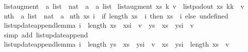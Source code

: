 \begin{isabellebody}
\isanewline
{}\isamarkupfalse%
\ list{\isacharunderscore}augment\ {\isacharcolon}{\isacharcolon}\ {\isachardoublequoteopen}{\isacharprime}a\ list\ {\isasymRightarrow}\ nat\ {\isasymRightarrow}\ {\isacharprime}a\ {\isasymRightarrow}\ {\isacharprime}a\ list{\isachardoublequoteclose}\ \isanewline
{\isachardoublequoteopen}list{\isacharunderscore}augment\ xs\ k\ v\ {\isacharequal}\ {\isacharparenleft}list{\isacharunderscore}pad{\isacharunderscore}out\ xs\ k{\isacharparenright}{\isacharbrackleft}k\ {\isacharcolon}{\isacharequal}\ v{\isacharbrackright}{\isachardoublequoteclose}\isanewline
\isanewline
{}\isamarkupfalse%
\ nth{\isacharprime}\ {\isacharcolon}{\isacharcolon}\ {\isachardoublequoteopen}{\isacharprime}a\ list\ {\isasymRightarrow}\ nat\ {\isasymRightarrow}\ {\isacharprime}a{\isachardoublequoteclose}\ \isanewline
{\isachardoublequoteopen}nth{\isacharprime}\ xs\ i\ {\isacharequal}\ {\isacharparenleft}if\ {\isacharparenleft}length\ xs\ {\isachargreater}\ i{\isacharparenright}\ then\ xs\ {\isacharbang}\ i\ else\ undefined{\isacharparenright}{\isachardoublequoteclose}\isanewline
\isanewline
{}\isamarkupfalse%
\ list{\isacharunderscore}update{\isacharunderscore}append{\isacharunderscore}lemma{}{\isacharcolon}\ {\isachardoublequoteopen}i\ {\isacharless}\ length\ xs\ {\isasymLongrightarrow}\ xs{\isacharbrackleft}i\ {\isacharcolon}{\isacharequal}\ v{\isacharbrackright}\ {\isacharat}\ ys\ {\isacharequal}\ {\isacharparenleft}xs\ {\isacharat}\ ys{\isacharparenright}{\isacharbrackleft}i\ {\isacharcolon}{\isacharequal}\ v{\isacharbrackright}{\isachardoublequoteclose}\isanewline
%
\isadelimproof
\ \ %
\endisadelimproof
%
\isatagproof
{}\isamarkupfalse%
\ {\isacharparenleft}simp\ add{\isacharcolon}\ list{\isacharunderscore}update{\isacharunderscore}append{\isacharparenright}%
\endisatagproof
{\isafoldproof}%
%
\isadelimproof
\isanewline
%
\endisadelimproof
\isanewline
{}\isamarkupfalse%
\ list{\isacharunderscore}update{\isacharunderscore}append{\isacharunderscore}lemma{}{\isacharcolon}\ {\isachardoublequoteopen}i\ {\isacharless}\ length\ ys\ {\isasymLongrightarrow}\ xs\ {\isacharat}\ ys{\isacharbrackleft}i\ {\isacharcolon}{\isacharequal}\ v{\isacharbrackright}\ {\isacharequal}\ {\isacharparenleft}xs\ {\isacharat}\ ys{\isacharparenright}{\isacharbrackleft}i\ {\isacharplus}\ length\ xs\ {\isacharcolon}{\isacharequal}\ v{\isacharbrackright}{\isachardoublequoteclose}\isanewline
%
\isadelimproof
\ \ %
\endisadelimproof
%
\isatagproof

\end{isabellebody}
